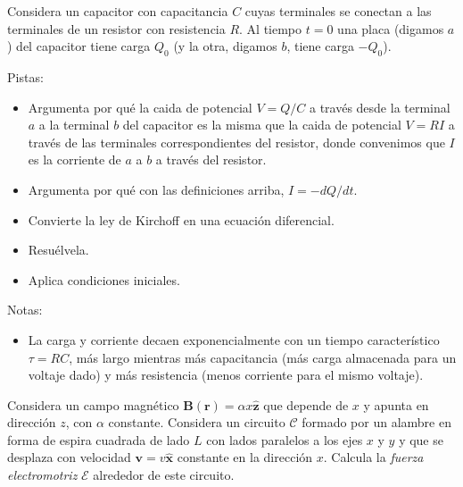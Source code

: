 \documentclass{exam}
\begin{document}
\begin{questions}
  \question Considera un capacitor con capacitancia $C$ cuyas
  terminales se conectan a las terminales de un resistor con resistencia $R$. Al
  tiempo $t=0$ una placa (digamos $a$) del capacitor tiene carga $Q_0$ (y la
  otra, digamos $b$, tiene carga $-Q_0$).

  Pistas:
  \begin{itemize}
  \item Argumenta por qué la caida de potencial $V=Q/C$ a través desde
    la terminal $a$ a la terminal $b$ del capacitor es la misma que la
    caida de potencial $V=RI$ a través de las terminales
    correspondientes del resistor, donde convenimos que $I$ es la
    corriente de $a$ a $b$ a través del resistor.
  \item Argumenta por qué con las definiciones arriba, $I=-dQ/dt$.
  \item Convierte la ley de Kirchoff en una ecuación diferencial.
  \item Resuélvela.
  \item Aplica condiciones iniciales.
  \end{itemize}
  Notas:
  \begin{itemize}
  \item La carga y corriente decaen exponencialmente con un tiempo
    característico $\tau=RC$, más largo mientras más capacitancia (más
    carga almacenada para un voltaje dado) y más resistencia (menos
    corriente para el mismo voltaje).
  \end{itemize}

  \question \label{l:a}Considera un campo magnético $\bm B(\bm r)=\alpha
  x\hat{\bm z}$ que depende de $x$ y apunta en dirección $z$, con
  $\alpha$ constante. Considera un circuito $\mathcal C$ formado
  por un alambre en forma de espira cuadrada de lado $L$ con lados
  paralelos a los ejes $x$ y $y$
  y que se desplaza con velocidad $\bm v=v\hat{\bm x}$ constante en la
  dirección $x$. Calcula la {\em fuerza electromotriz} $\mathcal E$
  alrededor de este circuito.


\end{questions}
\end{document}
